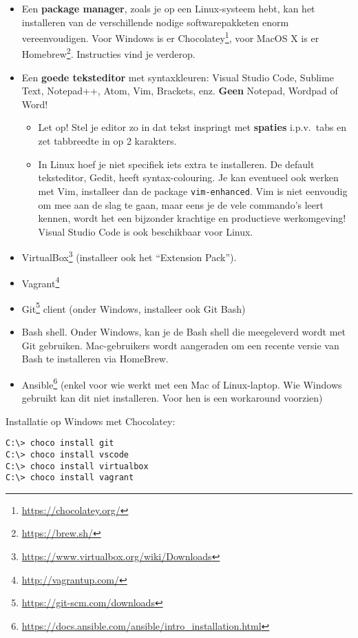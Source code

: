 \begin{itemize}
  \item Een \textbf{package manager}, zoals je op een Linux-systeem hebt, kan het installeren van de verschillende nodige softwarepakketen enorm vereenvoudigen. Voor Windows is er Chocolatey\footnote{\url{https://chocolatey.org/}}, voor MacOS X is er Homebrew\footnote{\url{https://brew.sh/}}. Instructies vind je verderop.
  \item Een \textbf{goede teksteditor} met syntaxkleuren: Visual Studio Code, Sublime Text, Notepad++, Atom, Vim, Brackets, enz. \textbf{Geen} Notepad, Wordpad of Word!
  \begin{itemize}
    \item Let op! Stel je editor zo in dat tekst inspringt met \textbf{spaties} i.p.v.\ tabs en zet tabbreedte in op 2 karakters.
    \item In Linux hoef je niet specifiek iets extra te installeren. De default teksteditor, Gedit, heeft syntax-colouring. Je kan eventueel ook werken met Vim, installeer dan de package \texttt{vim-enhanced}. Vim is niet eenvoudig om mee aan de slag te gaan, maar eens je de vele commando's leert kennen, wordt het een bijzonder krachtige en productieve werkomgeving! Visual Studio Code is ook beschikbaar voor Linux.
  \end{itemize}
  \item VirtualBox\footnote{\url{https://www.virtualbox.org/wiki/Downloads}} (installeer ook het ``Extension Pack'').
  \item Vagrant\footnote{\url{http://vagrantup.com/}}
  \item Git\footnote{\url{https://git-scm.com/downloads}} client (onder Windows, installeer ook Git Bash)
  \item Bash shell. Onder Windows, kan je de Bash shell die meegeleverd wordt met Git gebruiken. Mac-gebruikers wordt aangeraden om een recente versie van Bash te installeren via HomeBrew.
  \item Ansible\footnote{\url{https://docs.ansible.com/ansible/intro_installation.html}} (enkel voor wie werkt met een Mac of Linux-laptop. Wie Windows gebruikt kan dit niet installeren. Voor hen is een workaround voorzien)
\end{itemize}

Installatie op Windows met Chocolatey:

\begin{verbatim}
C:\> choco install git
C:\> choco install vscode
C:\> choco install virtualbox
C:\> choco install vagrant
\end{verbatim}

